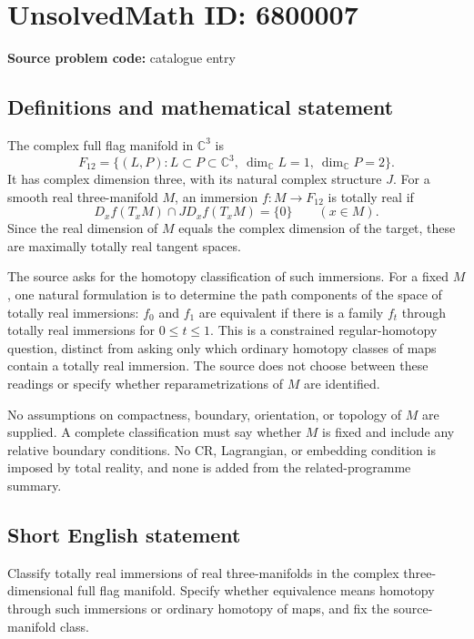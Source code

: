 \documentclass[11pt]{article}
\newcommand{\C}{\mathbb{C}}
\begin{document}
\section*{UnsolvedMath ID: 6800007}
\textbf{Source problem code:} catalogue entry
\subsection{Definitions and mathematical statement}
The complex full flag manifold in $\C^3$ is
\[
F_{12}=\{(L,P):L\subset P\subset\C^3,\ \dim_\C L=1,\ \dim_\C P=2\}.
\]
It has complex dimension three, with its natural complex structure $J$. For a smooth real three-manifold $M$, an immersion $f:M\to F_{12}$ is totally real if
\[
D_xf(T_xM)\cap J D_xf(T_xM)=\{0\}\qquad(x\in M).
\]
Since the real dimension of $M$ equals the complex dimension of the target, these are maximally totally real tangent spaces.

The source asks for the homotopy classification of such immersions. For a fixed $M$, one natural formulation is to determine the path components of the space of totally real immersions: $f_0$ and $f_1$ are equivalent if there is a family $f_t$ through totally real immersions for $0\leq t\leq1$. This is a constrained regular-homotopy question, distinct from asking only which ordinary homotopy classes of maps contain a totally real immersion. The source does not choose between these readings or specify whether reparametrizations of $M$ are identified.

No assumptions on compactness, boundary, orientation, or topology of $M$ are supplied. A complete classification must say whether $M$ is fixed and include any relative boundary conditions. No CR, Lagrangian, or embedding condition is imposed by total reality, and none is added from the related-programme summary.
\subsection{Short English statement}
Classify totally real immersions of real three-manifolds in the complex three-dimensional full flag manifold. Specify whether equivalence means homotopy through such immersions or ordinary homotopy of maps, and fix the source-manifold class.
\end{document}
